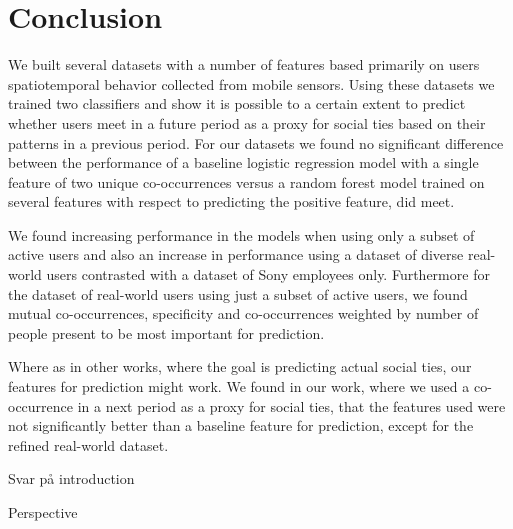 \chapter{Conclusion}
\label{chap:conclusion}
We built several datasets with a number of features based primarily on users spatiotemporal behavior collected from mobile sensors. Using these datasets we trained two classifiers and show it is possible to a certain extent to predict whether users meet in a future period as a proxy for social ties based on their patterns in a previous period. For our datasets we found no significant difference between the performance of a baseline logistic regression model with a single feature of two unique co-occurrences versus a random forest model trained on several features with respect to predicting the positive feature, did meet.

We found increasing performance in the models when using only a subset of active users and also an increase in performance using a dataset of diverse real-world users contrasted with a dataset of Sony employees only. Furthermore for the dataset of real-world users using just a subset of active users, we found mutual co-occurrences, specificity and co-occurrences weighted by number of people present to be most important for prediction.

Where as in other works, where the goal is predicting actual social ties, our features for prediction might work. We found in our work, where we used a co-occurrence in a next period as a proxy for social ties, that the features used were not significantly better than a baseline feature for prediction, except for the refined real-world dataset.

Svar på introduction
 
Perspective

